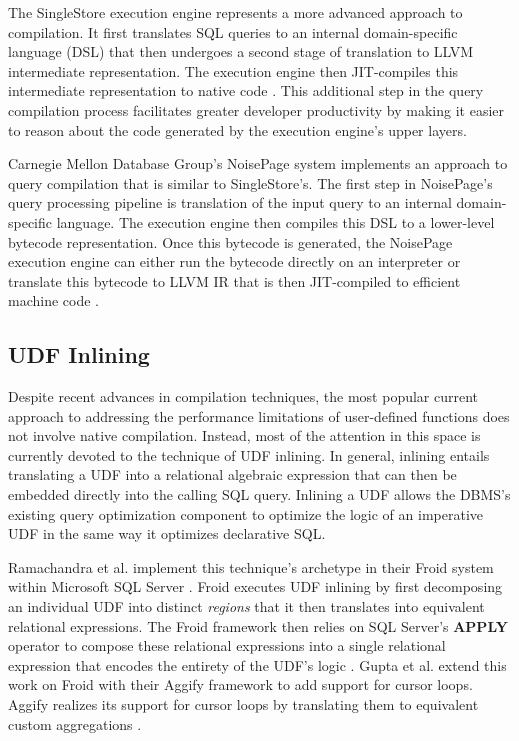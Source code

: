\documentclass{vldb}
\newcommand{\dbCode}[1]{{\sffamily\small \textbf{#1}}\xspace}
\begin{document}
The SingleStore \cite{singlestore} execution engine represents a more advanced approach to compilation. It first translates SQL queries to an internal domain-specific language (DSL) that then undergoes a second stage of translation to LLVM intermediate representation. The execution engine then JIT-compiles this intermediate representation to native code \cite{paroski16}. This additional step in the query compilation process facilitates greater developer productivity by making it easier to reason about the code generated by the execution engine's upper layers.

Carnegie Mellon Database Group's NoisePage system \cite{noisepage} implements an approach to query compilation that is similar to SingleStore's. The first step in NoisePage's query processing pipeline is translation of the input query to an internal domain-specific language. The execution engine then compiles this DSL to a lower-level bytecode representation. Once this bytecode is generated, the NoisePage execution engine can either run the bytecode directly on an interpreter or translate this bytecode to LLVM IR that is then JIT-compiled to efficient machine code \cite{pcq}.

\subsection{UDF Inlining}

Despite recent advances in compilation techniques, the most popular current approach to addressing the performance limitations of user-defined functions does not involve native compilation. Instead, most of the attention in this space is currently devoted to the technique of UDF inlining. In general, inlining entails translating a UDF into a relational algebraic expression that can then be embedded directly into the calling SQL query. Inlining a UDF allows the DBMS's existing query optimization component to optimize the logic of an imperative UDF in the same way it optimizes declarative SQL.

Ramachandra et al. implement this technique's archetype in their Froid system within Microsoft SQL Server \cite{sqlserver}. Froid executes UDF inlining by first decomposing an individual UDF into distinct \textit{regions} that it then translates into equivalent relational expressions. The Froid framework then relies on SQL Server's \dbCode{APPLY} operator to compose these relational expressions into a single relational expression that encodes the entirety of the UDF's logic \cite{froid}. Gupta et al. extend this work on Froid with their Aggify framework to add support for cursor loops. Aggify realizes its support for cursor loops by translating them to equivalent custom aggregations \cite{aggify}. 
\end{document}

